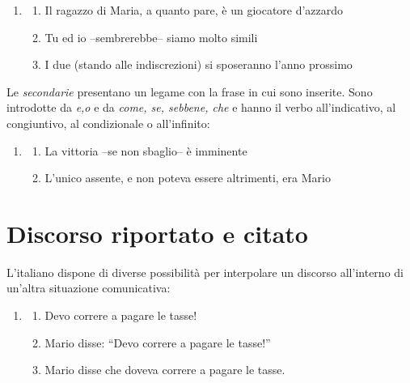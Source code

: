 \documentclass[
  a4paper,
  twoside,
  11pt,
  chapterprefix=false,
  bibliography=totocnumbered,
  listof=flat]{scrbook}
\providecommand{\tightlist}{%
  \setlength{\itemsep}{0pt}\setlength{\parskip}{0pt}}
\begin{document}
\begin{enumerate}
\def\labelenumi{(\arabic{enumi})}
\setcounter{enumi}{148}
\item
  \begin{enumerate}
  \def\labelenumii{\alph{enumii}.}
  \tightlist
  \item
    Il ragazzo di Maria, a quanto pare, è un giocatore d'azzardo
  \item
    Tu ed io --sembrerebbe-- siamo molto simili
  \item
    I due (stando alle indiscrezioni) si sposeranno l'anno prossimo
  \end{enumerate}
\end{enumerate}

Le \emph{secondarie} presentano un legame con la frase in cui sono inserite. Sono introdotte da \emph{e,o} e da \emph{come, se, sebbene, che} e hanno il verbo all'indicativo, al congiuntivo, al condizionale o all'infinito:

\begin{enumerate}
\def\labelenumi{(\arabic{enumi})}
\setcounter{enumi}{149}
\item
  \begin{enumerate}
  \def\labelenumii{\alph{enumii}.}
  \tightlist
  \item
    La vittoria --se non sbaglio-- è imminente
  \item
    L'unico assente, e non poteva essere altrimenti, era Mario
  \end{enumerate}
\end{enumerate}

\hypertarget{discorso-riportato-e-citato}{%
\section{Discorso riportato e citato}\label{discorso-riportato-e-citato}}

L'italiano dispone di diverse possibilità per interpolare un discorso all'interno di un'altra situazione comunicativa:

\begin{enumerate}
\def\labelenumi{(\arabic{enumi})}
\setcounter{enumi}{150}
\item
  \begin{enumerate}
  \def\labelenumii{\alph{enumii}.}
  \tightlist
  \item
    Devo correre a pagare le tasse!
  \item
    Mario disse: \enquote{Devo correre a pagare le tasse!}
  \item
    Mario disse che doveva correre a pagare le tasse.
  \end{enumerate}
\end{enumerate}
\end{document}

